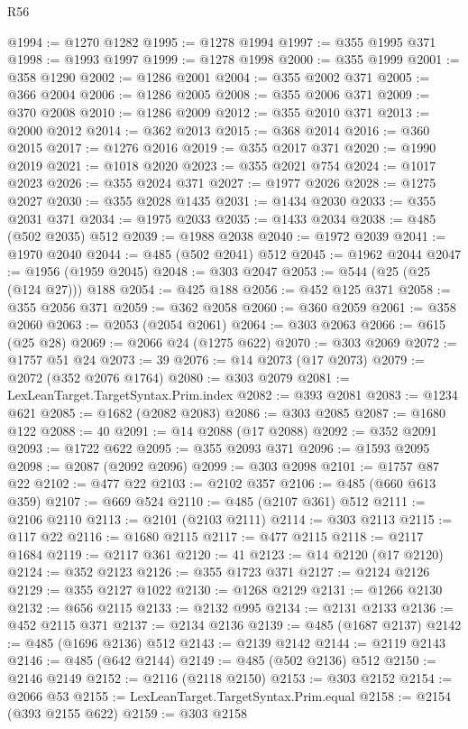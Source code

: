 \begin{lexlean}{R56}
\begin{coremodule}
@1994 := @1270 @1282
@1995 := @1278 @1994
@1997 := @355 @1995 @371
@1998 := @1993 @1997
@1999 := @1278 @1998
@2000 := @355 @1999
@2001 := @358 @1290
@2002 := @1286 @2001
@2004 := @355 @2002 @371
@2005 := @366 @2004
@2006 := @1286 @2005
@2008 := @355 @2006 @371
@2009 := @370 @2008
@2010 := @1286 @2009
@2012 := @355 @2010 @371
@2013 := @2000 @2012
@2014 := @362 @2013
@2015 := @368 @2014
@2016 := @360 @2015
@2017 := @1276 @2016
@2019 := @355 @2017 @371
@2020 := @1990 @2019
@2021 := @1018 @2020
@2023 := @355 @2021 @754
@2024 := @1017 @2023
@2026 := @355 @2024 @371
@2027 := @1977 @2026
@2028 := @1275 @2027
@2030 := @355 @2028 @1435
@2031 := @1434 @2030
@2033 := @355 @2031 @371
@2034 := @1975 @2033
@2035 := @1433 @2034
@2038 := @485 (@502 @2035) @512
@2039 := @1988 @2038
@2040 := @1972 @2039
@2041 := @1970 @2040
@2044 := @485 (@502 @2041) @512
@2045 := @1962 @2044
@2047 := @1956 (@1959 @2045)
@2048 := @303 @2047
@2053 := @544 (@25 (@25 (@124 @27))) @188
@2054 := @425 @188
@2056 := @452 @125 @371
@2058 := @355 @2056 @371
@2059 := @362 @2058
@2060 := @360 @2059
@2061 := @358 @2060
@2063 := @2053 (@2054 @2061)
@2064 := @303 @2063
@2066 := @615 (@25 @28)
@2069 := @2066 @24 (@1275 @622)
@2070 := @303 @2069
@2072 := @1757 @51 @24
@2073 := 39
@2076 := @14 @2073 (@17 @2073)
@2079 := @2072 (@352 @2076 @1764)
@2080 := @303 @2079
@2081 := LexLeanTarget.TargetSyntax.Prim.index
@2082 := @393 @2081
@2083 := @1234 @621
@2085 := @1682 (@2082 @2083)
@2086 := @303 @2085
@2087 := @1680 @122
@2088 := 40
@2091 := @14 @2088 (@17 @2088)
@2092 := @352 @2091
@2093 := @1722 @622
@2095 := @355 @2093 @371
@2096 := @1593 @2095
@2098 := @2087 (@2092 @2096)
@2099 := @303 @2098
@2101 := @1757 @87 @22
@2102 := @477 @22
@2103 := @2102 @357
@2106 := @485 (@660 @613 @359)
@2107 := @669 @524
@2110 := @485 (@2107 @361) @512
@2111 := @2106 @2110
@2113 := @2101 (@2103 @2111)
@2114 := @303 @2113
@2115 := @117 @22
@2116 := @1680 @2115
@2117 := @477 @2115
@2118 := @2117 @1684
@2119 := @2117 @361
@2120 := 41
@2123 := @14 @2120 (@17 @2120)
@2124 := @352 @2123
@2126 := @355 @1723 @371
@2127 := @2124 @2126
@2129 := @355 @2127 @1022
@2130 := @1268 @2129
@2131 := @1266 @2130
@2132 := @656 @2115
@2133 := @2132 @995
@2134 := @2131 @2133
@2136 := @452 @2115 @371
@2137 := @2134 @2136
@2139 := @485 (@1687 @2137)
@2142 := @485 (@1696 @2136) @512
@2143 := @2139 @2142
@2144 := @2119 @2143
@2146 := @485 (@642 @2144)
@2149 := @485 (@502 @2136) @512
@2150 := @2146 @2149
@2152 := @2116 (@2118 @2150)
@2153 := @303 @2152
@2154 := @2066 @53
@2155 := LexLeanTarget.TargetSyntax.Prim.equal
@2158 := @2154 (@393 @2155 @622)
@2159 := @303 @2158

\end{coremodule}
\end{lexlean}
